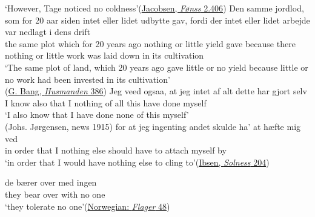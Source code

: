 \glt `However, Tage noticed no coldness'\hfill(\href{https://tekster.kb.dk/text/adl-texts-jacob03val-root#idm139892126928240}{Jacobsen, \textit{Fønss} 2.406})
\ex  \gll Den samme jordlod, som for 20 aar siden intet eller lidet udbytte gav, fordi der intet eller lidet arbejde var nedlagt i dens drift\\
 the same plot which for 20 years ago nothing or little yield gave because there nothing or little work was {laid down} in its cultivation\\
\glt `The same plot of land, which 20 years ago gave little or no yield because little or no work had been invested in its cultivation'\\\hfill(\href{https://archive.org/details/Tilskuerenmaaned1902vvgoog/page/386/mode/2up?q=%22Den+samme+jordlod%22&view=theater}{G. Bang, \textit{Husmanden} 386})
\ex 
 \gll Jeg veed ogsaa, at jeg intet af alt dette har gjort selv\\
 I know also that I nothing of all this have done myself\\
\glt `I also know that I have done none of this myself'\\\hfill(Johs. Jørgensen, news 1915) %
\ex 
 \gll for at jeg ingenting andet skulde ha’ at hæfte mig ved\\
 {in order} that I nothing else should have to attach myself by\\
\glt `in order that I would have nothing else to cling to'\hfill(\href{https://archive.org/details/bygmestersolnes00ibsegoog/page/n218/mode/2up?view=theater&q=%22for+at+jeg+ingen%C2%ADting+andet%22}{Ibsen, \textit{Solness} 204})
\z
\z{}

\ea \label{ex:06-30}
 \gll de bærer over med ingen\\
 they bear over with {no one}\\
\glt `they tolerate no one'\hfill(\href{http://f9.no/ebok/filer/bjornson_det_flager_i_byen_og_paa_havnen.html}{Norwegian: \textit{Flager} 48})
\z

